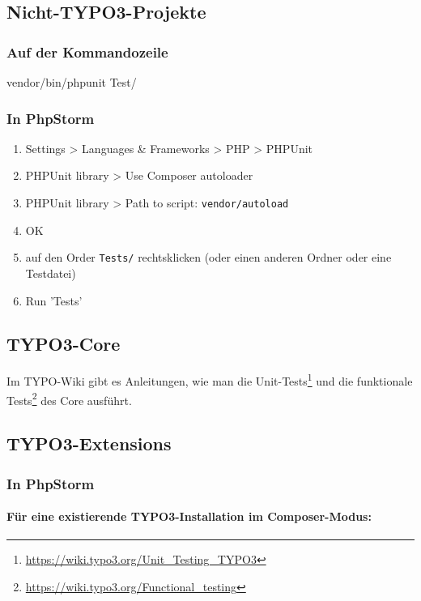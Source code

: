 \documentclass[a4paper,11pt,headsepline]{scrartcl}
\begin{document}
\subsection{Nicht-TYPO3-Projekte}

\subsubsection{Auf der Kommandozeile}

\begin{bashcode}
vendor/bin/phpunit Test/
\end{bashcode}

\subsubsection{In PhpStorm}
\begin{enumerate}
  \item Settings > Languages \& Frameworks > PHP > PHPUnit
  \item PHPUnit library > Use Composer autoloader
  \item PHPUnit library > Path to script: \texttt{vendor/autoload}
  \item OK
  \item auf den Order \texttt{Tests/} rechtsklicken (oder einen anderen Ordner oder eine Testdatei)
  \item Run 'Tests'
\end{enumerate}


\subsection{TYPO3-Core}

Im TYPO-Wiki gibt es Anleitungen, wie man die Unit-Tests\footnote{\url{https://wiki.typo3.org/Unit_Testing_TYPO3}} und die funktionale Tests\footnote{\url{https://wiki.typo3.org/Functional_testing}} des Core ausführt.


\subsection{TYPO3-Extensions}

\subsubsection{In PhpStorm}

\paragraph{Für eine existierende TYPO3-Installation im Composer-Modus:}
\end{document}
